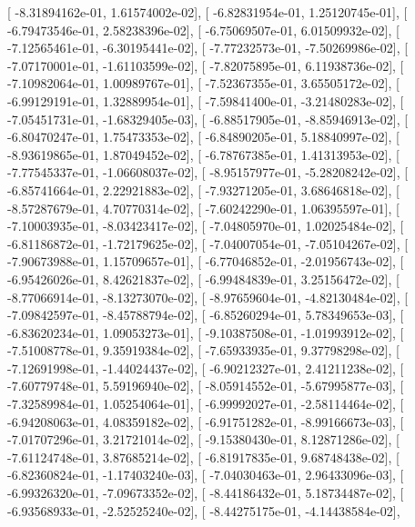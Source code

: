 \documentclass{article}
\begin{document}
       [ -8.31894162e-01,   1.61574002e-02],
       [ -6.82831954e-01,   1.25120745e-01],
       [ -6.79473546e-01,   2.58238396e-02],
       [ -6.75069507e-01,   6.01509932e-02],
       [ -7.12565461e-01,  -6.30195441e-02],
       [ -7.77232573e-01,  -7.50269986e-02],
       [ -7.07170001e-01,  -1.61103599e-02],
       [ -7.82075895e-01,   6.11938736e-02],
       [ -7.10982064e-01,   1.00989767e-01],
       [ -7.52367355e-01,   3.65505172e-02],
       [ -6.99129191e-01,   1.32889954e-01],
       [ -7.59841400e-01,  -3.21480283e-02],
       [ -7.05451731e-01,  -1.68329405e-03],
       [ -6.88517905e-01,  -8.85946913e-02],
       [ -6.80470247e-01,   1.75473353e-02],
       [ -6.84890205e-01,   5.18840997e-02],
       [ -8.93619865e-01,   1.87049452e-02],
       [ -6.78767385e-01,   1.41313953e-02],
       [ -7.77545337e-01,  -1.06608037e-02],
       [ -8.95157977e-01,  -5.28208242e-02],
       [ -6.85741664e-01,   2.22921883e-02],
       [ -7.93271205e-01,   3.68646818e-02],
       [ -8.57287679e-01,   4.70770314e-02],
       [ -7.60242290e-01,   1.06395597e-01],
       [ -7.10003935e-01,  -8.03423417e-02],
       [ -7.04805970e-01,   1.02025484e-02],
       [ -6.81186872e-01,  -1.72179625e-02],
       [ -7.04007054e-01,  -7.05104267e-02],
       [ -7.90673988e-01,   1.15709657e-01],
       [ -6.77046852e-01,  -2.01956743e-02],
       [ -6.95426026e-01,   8.42621837e-02],
       [ -6.99484839e-01,   3.25156472e-02],
       [ -8.77066914e-01,  -8.13273070e-02],
       [ -8.97659604e-01,  -4.82130484e-02],
       [ -7.09842597e-01,  -8.45788794e-02],
       [ -6.85260294e-01,   5.78349653e-03],
       [ -6.83620234e-01,   1.09053273e-01],
       [ -9.10387508e-01,  -1.01993912e-02],
       [ -7.51008778e-01,   9.35919384e-02],
       [ -7.65933935e-01,   9.37798298e-02],
       [ -7.12691998e-01,  -1.44024437e-02],
       [ -6.90212327e-01,   2.41211238e-02],
       [ -7.60779748e-01,   5.59196940e-02],
       [ -8.05914552e-01,  -5.67995877e-03],
       [ -7.32589984e-01,   1.05254064e-01],
       [ -6.99992027e-01,  -2.58114464e-02],
       [ -6.94208063e-01,   4.08359182e-02],
       [ -6.91751282e-01,  -8.99166673e-03],
       [ -7.01707296e-01,   3.21721014e-02],
       [ -9.15380430e-01,   8.12871286e-02],
       [ -7.61124748e-01,   3.87685214e-02],
       [ -6.81917835e-01,   9.68748438e-02],
       [ -6.82360824e-01,  -1.17403240e-03],
       [ -7.04030463e-01,   2.96433096e-03],
       [ -6.99326320e-01,  -7.09673352e-02],
       [ -8.44186432e-01,   5.18734487e-02],
       [ -6.93568933e-01,  -2.52525240e-02],
       [ -8.44275175e-01,  -4.14438584e-02],
\end{document}
